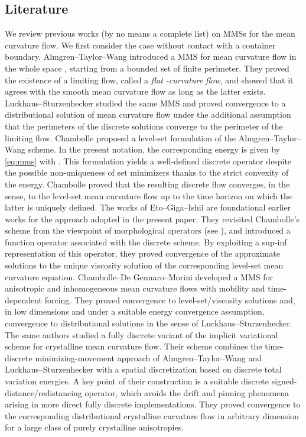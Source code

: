\documentclass[11pt]{article}
\makeatletter
\numberwithin{equation}{section}
\newcounter{mathrecordid}
\newcommand{\mathboxbegin}[1]{%
  \stepcounter{mathrecordid}%
  \immediate\write\mathrecords{\themathrecordid,#1}%
  \special{pdf:bann << /Type /Annot /Subtype /Link /Border [0 0 0]
    /MathBoxID \themathrecordid /F 2
    /A << /S /URI /URI (urn:mathbox:\themathrecordid) >> >>}}
\newcommand{\mathboxinlineplain}[1]{$#1$}
\newcommand{\mathboxinline}[1]{%
  $\mathboxbegin{inline}%
  \special{pdf:literal direct /MathBoxBegin\themathrecordid\space MP}%
  #1\special{pdf:literal direct /MathBoxEnd\themathrecordid\space MP}%
  \special{pdf:eann}$}
\newcommand{\recordmath}{%
  \ifmeasuring@\expandafter\mathboxinlineplain
  \else\expandafter\mathboxinline\fi}
\makeatother
\begin{document}
\subsection{Literature}

We review previous works (by no means a complete list) on MMSs for the mean curvature flow. 
We first consider the case without contact with a container boundary.
Almgren--Taylor--Wang \cite{Almgren93} introduced a MMS for mean curvature flow in the whole space \recordmath{\mathbb{R}^d}, starting from a bounded set \recordmath{E_0} of finite perimeter.  They proved the existence of a limiting flow, called a \textit{flat \recordmath{\Phi}-curvature flow}, and showed that it agrees with the smooth mean curvature flow as long as the latter exists.
Luckhaus--Sturzenhecker \cite{LS95} studied the same MMS and proved convergence to a distributional solution of mean curvature flow under the additional assumption that the perimeters of the discrete solutions converge to the perimeter of the limiting flow.
Chambolle \cite{Chambolle04} proposed a level-set formulation of the Almgren--Taylor--Wang scheme.  In the present notation, the corresponding energy is given by \eqref{eq:mms} with \recordmath{\beta\equiv 0}.  This formulation yields a well-defined discrete operator despite the possible non-uniqueness of set minimizers thanks to the strict convexity of the energy.
Chambolle proved that the resulting discrete flow converges, in the \recordmath{L^1} sense, to the level-set mean curvature flow up to the time horizon on which the latter is uniquely defined.
The works of Eto--Giga--Ishii \cite{EGI12-1,EGI12-2} are foundational earlier works for the approach adopted in the present paper.  They revisited Chambolle's scheme from the viewpoint of morphological operators (see \cite{C03}), and introduced a function operator associated with the discrete scheme.  By exploiting a sup-inf representation of this operator, they proved convergence of the approximate solutions to the unique viscosity solution of the corresponding level-set mean curvature equation.
Chambolle--De Gennaro--Morini \cite{CDM24} developed a MMS for anisotropic and inhomogeneous mean curvature flows with mobility and time-dependent forcing.  They proved convergence to level-set/viscosity solutions and, in low dimensions and under a suitable energy convergence assumption, convergence to distributional solutions in the sense of Luckhaus--Sturzenhecker.
The same authors \cite{CDGM26} studied a fully discrete variant of the implicit variational scheme for crystalline mean curvature flow.  Their scheme combines the time-discrete minimizing-movement approach of Almgren--Taylor--Wang and Luckhaus--Sturzenhecker with a spatial discretization based on discrete total variation energies.  A key point of their construction is a suitable discrete signed-distance/redistancing operator, which avoids the drift and pinning phenomena arising in more direct fully discrete implementations.  They proved convergence to the corresponding distributional crystalline curvature flow in arbitrary dimension for a large class of purely crystalline anisotropies.
\end{document}
